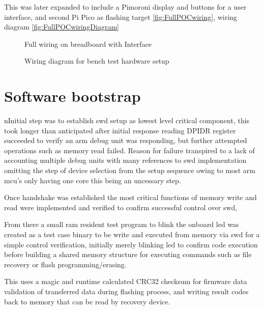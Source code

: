 \pagebreak
This was later expanded to include a Pimoroni display and buttons for a user interface, and second Pi Pico as flashing target \autoref{fig:FullPOCwiring}, wiring diagram \autoref{fig:FullPOCwiringDiagram}

\begin{figure}[ht]
	\centering
	\caption{Full wiring on breadboard with Interface}
	\label{fig:FullPOCwiring}
\end{figure}

\begin{figure}[ht]
	\centering
	\caption{Wiring diagram for bench test hardware setup}
	\label{fig:FullPOCwiringDiagram}
\end{figure}
\clearpage
\section{Software bootstrap}
nInitial step was to establish \gls{swd} setup as lowest level critical component, this took longer than anticipated after initial response reading DPIDR register succeeded to verify an \gls{arm} debug unit was responding, but further attempted operations such as memory read failed. Reason for failure transpired to a lack of accounting multiple debug units\cite{raspberrypiltdRaspberryPiPico} with many references to \gls{swd} implementation omitting the step of device selection from the setup sequence owing to most \gls{arm} \gls{mcu}'s only having one core this being an uncessary step.

Once handshake was established the most critical functions of memory write and read were implemented and verified to confirm successful control over \gls{swd}, 

From there a small \gls{ram} resident test program to blink the onboard \gls{led} was created as a test case binary to be write and executed from memory via \gls{swd} for a simple control verification, initially merely blinking \gls{led} to confirm code execution before building a shared memory structure for executing commands such as file recovery or flash programming/erasing.

This uses a \gls{magic} and runtime calculated CRC32 checksum for firmware data validation of transferred data during flashing process, and writing result codes back to memory that can be read by recovery device.

